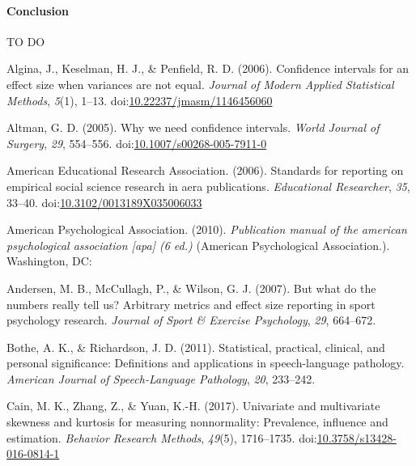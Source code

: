 \documentclass[
  man,floatsintext]{apa6}
\begin{document}
\hypertarget{conclusion}{%
\paragraph{Conclusion}\label{conclusion}}

TO DO

\hypertarget{refs}{}
\leavevmode\hypertarget{ref-Algina_et_al_2006}{}%
Algina, J., Keselman, H. J., \& Penfield, R. D. (2006). Confidence intervals for an effect size when variances are not equal. \emph{Journal of Modern Applied Statistical Methods}, \emph{5}(1), 1--13. doi:\href{https://doi.org/10.22237/jmasm/1146456060}{10.22237/jmasm/1146456060}

\leavevmode\hypertarget{ref-Altman_2005}{}%
Altman, G. D. (2005). Why we need confidence intervals. \emph{World Journal of Surgery}, \emph{29}, 554--556. doi:\href{https://doi.org/10.1007/s00268-005-7911-0}{10.1007/s00268-005-7911-0}

\leavevmode\hypertarget{ref-AERA_2006}{}%
American Educational Research Association. (2006). Standards for reporting on empirical social science research in aera publications. \emph{Educational Researcher}, \emph{35}, 33--40. doi:\href{https://doi.org/10.3102/0013189X035006033}{10.3102/0013189X035006033}

\leavevmode\hypertarget{ref-APA_2010}{}%
American Psychological Association. (2010). \emph{Publication manual of the american psychological association {[}apa{]} (6 ed.)} (American Psychological Association.). Washington, DC:

\leavevmode\hypertarget{ref-Andersen_et_al_2007}{}%
Andersen, M. B., McCullagh, P., \& Wilson, G. J. (2007). But what do the numbers really tell us? Arbitrary metrics and effect size reporting in sport psychology research. \emph{Journal of Sport \& Exercise Psychology}, \emph{29}, 664--672.

\leavevmode\hypertarget{ref-Bothe_Richardson_2011}{}%
Bothe, A. K., \& Richardson, J. D. (2011). Statistical, practical, clinical, and personal significance: Definitions and applications in speech-language pathology. \emph{American Journal of Speech-Language Pathology}, \emph{20}, 233--242.

\leavevmode\hypertarget{ref-Cain_et_al_2017}{}%
Cain, M. K., Zhang, Z., \& Yuan, K.-H. (2017). Univariate and multivariate skewness and kurtosis for measuring nonnormality: Prevalence, influence and estimation. \emph{Behavior Research Methods}, \emph{49}(5), 1716--1735. doi:\href{https://doi.org/10.3758/s13428-016-0814-1}{10.3758/s13428-016-0814-1}
\end{document}
